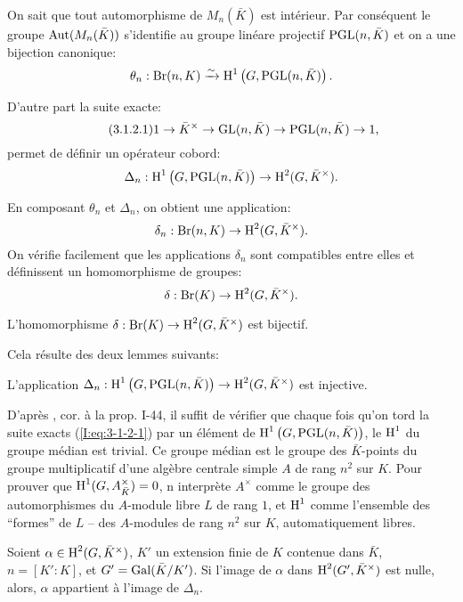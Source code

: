On sait que tout automorphisme de $M_n(\bar K)$ est intérieur. Par 
conséquent le groupe $\operatorname{Aut}(M_n(\bar K))$ s'identifie au groupe linéare 
projectif $\operatorname{PGL}(n,\bar K)$ et on a une bijection canonique:
\[
  \theta_n : \operatorname{Br}(n,K) \xrightarrow\sim \operatorname{H}^1\left(G,\operatorname{PGL}(n,\bar K)\right)\text{.}
\]

D'autre part la suite exacte:
\begin{equation*}\tag{3.1.2.1}\label{I:eq:3-1-2-1}
  1 \to \bar K^\times \to \operatorname{GL}(n,\bar K) \to \operatorname{PGL}(n,\bar K) \to 1\text{,}
\end{equation*}
permet de définir un opérateur cobord:
\[
  \Delta_n : \operatorname{H}^1\left(G,\operatorname{PGL}(n,\bar K)\right) \to \operatorname{H}^2(G,\bar K^\times)\text{.}
\]

En composant $\theta_n$ et $\Delta_n$, on obtient une application:
\[
  \delta_n : \operatorname{Br}(n,K) \to \operatorname{H}^2(G,\bar K^\times)\text{.}
\]
On vérifie facilement que les applications $\delta_n$ sont compatibles entre 
elles et définissent un homomorphisme de groupes:
\[
  \delta : \operatorname{Br}(K) \to \operatorname{H}^2(G,\bar K^\times)\text{.}
\]





\begin{proposition}\label{I:3-1-3}
L'homomorphisme $\delta:\operatorname{Br}(K)\to \operatorname{H}^2(G,\bar K^\times)$ est bijectif. 
\end{proposition}

Cela résulte des deux lemmes suivants:





\begin{lemma}\label{I:3-1-4}
L'application 
$\Delta_n:\operatorname{H}^1\left(G,\operatorname{PGL}(n,\bar K)\right)\to \operatorname{H}^2(G,\bar K^\times)$ est 
injective.
\end{lemma}

D'après \cite{se94}, cor. à la prop. I-44, il suffit de vérifier que chaque 
fois qu'on tord la suite exacts (\ref{I:eq:3-1-2-1}) par un élément de 
$\operatorname{H}^1\left(G,\operatorname{PGL}(n,\bar K)\right)$, le $\operatorname{H}^1$ du groupe médian est trivial. 
Ce groupe médian est le groupe des $\bar K$-points du groupe multiplicatif 
d'une algèbre centrale simple $A$ de rang $n^2$ sur $K$. Pour prouver que 
$\operatorname{H}^1(G,A_{\bar K}^\times) = 0$, n interprète $A^\times$ comme le groupe 
des automorphismes du $A$-module libre $L$ de rang $1$, et $\operatorname{H}^1$ comme 
l'ensemble des ``formes'' de $L$ -- des $A$-modules de rang $n^2$ sur $K$, 
automatiquement libres. 





\begin{lemma}\label{I:3-1-5}
Soient $\alpha\in \operatorname{H}^2(G,\bar K^\times)$, $K'$ un extension finie de $K$ 
contenue dans $\bar K$, $n=[K':K]$, et $G'=\operatorname{Gal}(\bar K/K')$. Si l'image de 
$\alpha$ dans $\operatorname{H}^2(G',\bar K^\times)$ est nulle, alors, $\alpha$ appartient 
à l'image de $\Delta_n$. 
\end{lemma}

